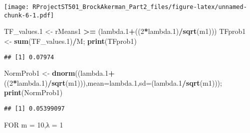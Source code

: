 \documentclass[
]{article}
\newenvironment{Shaded}{\begin{snugshade}}{\end{snugshade}}
\newcommand{\DataTypeTok}[1]{\textcolor[rgb]{0.13,0.29,0.53}{#1}}
\newcommand{\DecValTok}[1]{\textcolor[rgb]{0.00,0.00,0.81}{#1}}
\newcommand{\FloatTok}[1]{\textcolor[rgb]{0.00,0.00,0.81}{#1}}
\newcommand{\KeywordTok}[1]{\textcolor[rgb]{0.13,0.29,0.53}{\textbf{#1}}}
\newcommand{\NormalTok}[1]{#1}
\newcommand{\OperatorTok}[1]{\textcolor[rgb]{0.81,0.36,0.00}{\textbf{#1}}}
\newcommand{\StringTok}[1]{\textcolor[rgb]{0.31,0.60,0.02}{#1}}
\begin{document}
\texttt{[image: RProjectST501\_BrockAkerman\_Part2\_files/figure-latex/unnamed-chunk-6-1.pdf]}

\begin{Shaded}
\begin{Highlighting}[]
\NormalTok{TF_values}\FloatTok{.1}\NormalTok{ <-}\StringTok{ }\NormalTok{rMeans1 }\OperatorTok{>=}\StringTok{ }\NormalTok{(lambda}\FloatTok{.1}\OperatorTok{+}\NormalTok{((}\DecValTok{2}\OperatorTok{*}\NormalTok{lambda}\FloatTok{.1}\NormalTok{)}\OperatorTok{/}\KeywordTok{sqrt}\NormalTok{(m1)))}
\NormalTok{TFprob1 <-}\StringTok{ }\KeywordTok{sum}\NormalTok{(TF_values}\FloatTok{.1}\NormalTok{)}\OperatorTok{/}\NormalTok{M; }\KeywordTok{print}\NormalTok{(TFprob1)}
\end{Highlighting}
\end{Shaded}

\begin{verbatim}
## [1] 0.07974
\end{verbatim}

\begin{Shaded}
\begin{Highlighting}[]
\NormalTok{NormProb1 <-}\StringTok{ }\KeywordTok{dnorm}\NormalTok{((lambda}\FloatTok{.1}\OperatorTok{+}\NormalTok{((}\DecValTok{2}\OperatorTok{*}\NormalTok{lambda}\FloatTok{.1}\NormalTok{)}\OperatorTok{/}\KeywordTok{sqrt}\NormalTok{(m1))),}\DataTypeTok{mean=}\NormalTok{lambda}\FloatTok{.1}\NormalTok{,}\DataTypeTok{sd=}\NormalTok{(lambda}\FloatTok{.1}\OperatorTok{/}\KeywordTok{sqrt}\NormalTok{(m1))); }\KeywordTok{print}\NormalTok{(NormProb1)}
\end{Highlighting}
\end{Shaded}

\begin{verbatim}
## [1] 0.05399097
\end{verbatim}

FOR m = 10,λ = 1
\end{document}
